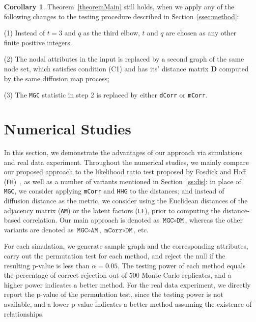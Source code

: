 \documentclass[11pt]{article}
\theoremstyle{definition}
\newtheorem{corollary}{Corollary}
\begin{document}
\begin{corollary}
\label{main_corollary}
Theorem~\ref{theoremMain} still holds, when we apply any of the following changes to the testing procedure described in Section~\ref{ssec:method}:
\begin{description}[align=left]
\item [] (1) Instead of $t=3$ and $q$ as the third elbow, $t$ and $q$ are chosen as any other finite positive integers.

\item [] (2) The nodal attributes in the input is replaced by a second graph of the same node set, which satisfies condition (C1) and has its' distance matrix $\mathbf{D}$ computed by the same diffusion map process;

\item [] (3) The \texttt{MGC} statistic in step 2 is replaced by either \texttt{dCorr} or \texttt{mCorr}.
\end{description}
\end{corollary}

\section{Numerical Studies}
\label{sec:simulation}

In this section, we demonstrate the advantages of our approach via simulations and real data experiment. Throughout the numerical studies, we mainly compare our proposed approach to the likelihood ratio test proposed by Fosdick and Hoff (\texttt{FH})~\cite{fosdick2015testing}, as well as a number of variants mentioned in Section~\ref{ss:dis}: in place of \texttt{MGC}, we consider applying \texttt{mCorr} and \texttt{HHG} to the distances; and instead of diffusion distance as the metric, we consider using the Euclidean distances of the adjacency matrix (\texttt{AM}) or the latent factors (\texttt{LF}), prior to computing the distance-based correlation. Our main approach is denoted as $\texttt{MGC} \circ \texttt{DM}$, whereas the other variants are denoted as $\texttt{MGC} \circ \texttt{AM}$, $\texttt{mCorr} \circ \texttt{DM}$, etc. 

For each simulation, we generate sample graph and the corresponding attributes, carry out the permutation test for each method, and reject the null if the resulting p-value is less than $\alpha = 0.05$. The testing power of each method equals the percentage of correct rejection out of $500$ Monte-Carlo replicates, and a higher power indicates a better method. For the real data experiment, we directly report the p-value of the permutation test, since the testing power is not available, and a lower p-value indicates a better method assuming the existence of relationships. 
\end{document}
